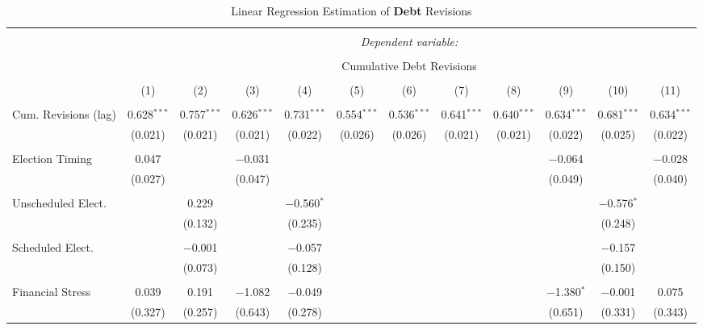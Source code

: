 
\begin{table}[!htbp] \centering 
  \caption{Linear Regression Estimation of \textbf{Debt} Revisions} 
  \label{debt_results} 
\tiny 
\begin{tabular}{@{\extracolsep{5pt}}lccccccccccc} 
\\[-1.8ex]\hline 
\hline \\[-1.8ex] 
 & \multicolumn{11}{c}{\textit{Dependent variable:}} \\ 
\cline{2-12} 
\\[-1.8ex] & \multicolumn{11}{c}{Cumulative Debt Revisions} \\ 
\\[-1.8ex] & (1) & (2) & (3) & (4) & (5) & (6) & (7) & (8) & (9) & (10) & (11)\\ 
\hline \\[-1.8ex] 
 Cum. Revisions (lag) & 0.628$^{***}$ & 0.757$^{***}$ & 0.626$^{***}$ & 0.731$^{***}$ & 0.554$^{***}$ & 0.536$^{***}$ & 0.641$^{***}$ & 0.640$^{***}$ & 0.634$^{***}$ & 0.681$^{***}$ & 0.634$^{***}$ \\ 
  & (0.021) & (0.021) & (0.021) & (0.022) & (0.026) & (0.026) & (0.021) & (0.021) & (0.022) & (0.025) & (0.022) \\ 
  & & & & & & & & & & & \\ 
 Election Timing & 0.047 &  & $-$0.031 &  &  &  &  &  & $-$0.064 &  & $-$0.028 \\ 
  & (0.027) &  & (0.047) &  &  &  &  &  & (0.049) &  & (0.040) \\ 
  & & & & & & & & & & & \\ 
 Unscheduled Elect. &  & 0.229 &  & $-$0.560$^{*}$ &  &  &  &  &  & $-$0.576$^{*}$ &  \\ 
  &  & (0.132) &  & (0.235) &  &  &  &  &  & (0.248) &  \\ 
  & & & & & & & & & & & \\ 
 Scheduled Elect. &  & $-$0.001 &  & $-$0.057 &  &  &  &  &  & $-$0.157 &  \\ 
  &  & (0.073) &  & (0.128) &  &  &  &  &  & (0.150) &  \\ 
  & & & & & & & & & & & \\ 
 Financial Stress & 0.039 & 0.191 & $-$1.082 & $-$0.049 &  &  &  &  & $-$1.380$^{*}$ & $-$0.001 & 0.075 \\ 
  & (0.327) & (0.257) & (0.643) & (0.278) &  &  &  &  & (0.651) & (0.331) & (0.343) \\ 

\end{tabular}
\end{table}
